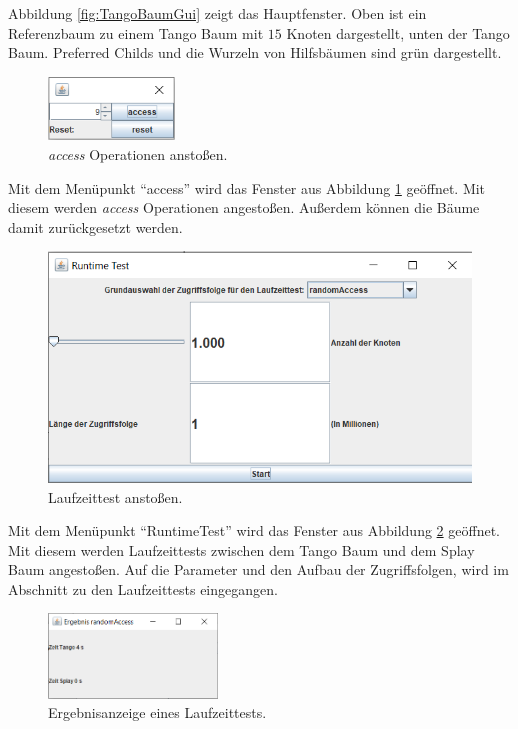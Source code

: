 \documentclass[a4paper,12pt]{article}
\begin{document}
\noindent Abbildung \ref{fig:TangoBaumGui} zeigt das Hauptfenster. Oben ist ein Referenzbaum zu einem Tango Baum mit  $15$ Knoten dargestellt, unten der Tango Baum. Preferred Childs und die Wurzeln von Hilfsbäumen sind grün dargestellt.


\begin{figure}[H]
	\centering
	\includegraphics[width=0.3\textwidth]{"Medien/laufzeittest/accessGUI"}
	\caption{\textit{access} Operationen anstoßen.}
	\label{fig:accessGui}
\end{figure}
\noindent Mit dem Menüpunkt \enquote{access} wird das Fenster aus Abbildung \ref{fig:accessGui} geöffnet. Mit diesem werden \textit{access} Operationen angestoßen. Außerdem können die Bäume damit zurückgesetzt werden.

\begin{figure}[H]
	\centering
	\includegraphics[width=1\textwidth]{"Medien/laufzeittest/RuntimeGui"}
	\caption{Laufzeittest anstoßen.}
	\label{fig:RuntimeGui}
\end{figure}

\noindent Mit dem Menüpunkt \enquote{RuntimeTest} wird das Fenster aus Abbildung \ref{fig:RuntimeGui} geöffnet. Mit diesem werden Laufzeittests zwischen dem Tango Baum und dem Splay Baum  angestoßen. Auf die Parameter und den Aufbau der Zugriffsfolgen, wird im Abschnitt zu den Laufzeittests eingegangen.


\begin{figure}[H]
	\centering
	\includegraphics[width=0.4\textwidth]{"Medien/laufzeittest/ResultGUI"}
	\caption{Ergebnisanzeige eines Laufzeittests.}
	\label{fig:ResultGUI}
\end{figure}
\end{document}
